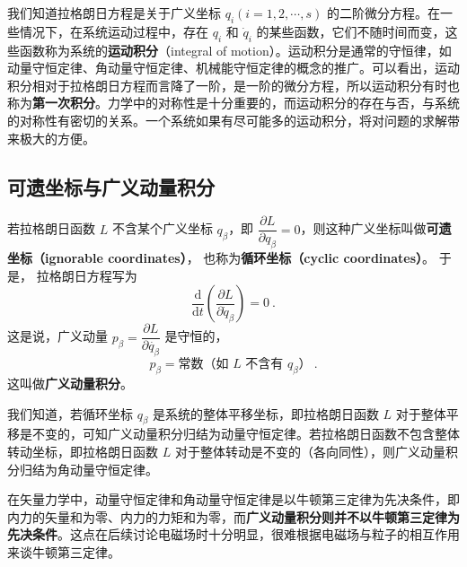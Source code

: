 

我们知道拉格朗日方程是关于广义坐标 $q_i(i=1,2,\cdots,s)$ 的二阶微分方程。在一些情况下，在系统运动过程中，存在 $q_i$ 和 $\dot{q}_i$ 的某些函数，它们不随时间而变，这些函数称为系统的\textbf{运动积分}（integral of motion）。运动积分是通常的守恒律，如动量守恒定律、角动量守恒定律、机械能守恒定律的概念的推广。可以看出，运动积分相对于拉格朗日方程而言降了一阶，是一阶的微分方程，所以运动积分有时也称为\textbf{第一次积分}。力学中的对称性是十分重要的，而运动积分的存在与否，与系统的对称性有密切的关系。一个系统如果有尽可能多的运动积分，将对问题的求解带来极大的方便。

\subsection{可遗坐标与广义动量积分}

若拉格朗日函数 $L$ 不含某个广义坐标 $q_\beta$，即 $\dfrac{\partial L}{\partial q_\beta}=0$，则这种广义坐标叫做\textbf{可遗坐标（ignorable coordinates）}， 也称为\textbf{循环坐标（cyclic coordinates）}。 于是， 拉格朗日方程写为
\begin{equation}
\frac{\mathrm{d}}{\mathrm{d} t}\left(\frac{\partial L}{\partial \dot{q}_{\beta}}\right)=0~.
\end{equation}
这是说，广义动量 $p_\beta=\dfrac{\partial L} {\partial \dot{q_\beta}}$ 是守恒的，
\begin{equation}
p_\beta= \text{常数（如 $L$ 不含有 $q_\beta$）}~.
\end{equation}
这叫做\textbf{广义动量积分}。

我们知道，若循环坐标 $q_\beta$ 是系统的整体平移坐标，即拉格朗日函数 $L $ 对于整体平移是不变的，可知广义动量积分归结为动量守恒定律。若拉格朗日函数不包含整体转动坐标，即拉格朗日函数 $L$ 对于整体转动是不变的（各向同性），则广义动量积分归结为角动量守恒定律。

在矢量力学中，动量守恒定律和角动量守恒定律是以牛顿第三定律为先决条件，即内力的矢量和为零、内力的力矩和为零，而\textbf{广义动量积分则并不以牛顿第三定律为先决条件}。这点在后续讨论电磁场时十分明显，很难根据电磁场与粒子的相互作用来谈牛顿第三定律。

